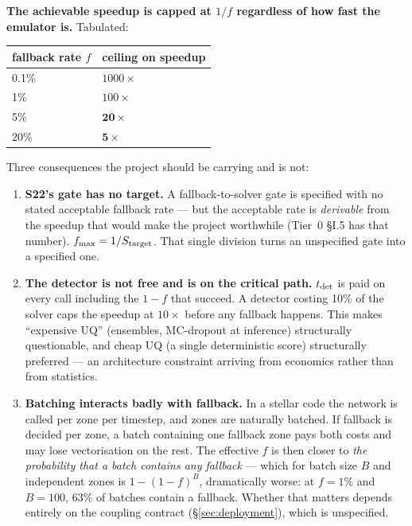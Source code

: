 \textbf{The achievable speedup is capped at $1/f$ regardless of how fast the
emulator is.} Tabulated:

\begin{center}
\begin{tabular}{@{}ll@{}}
\toprule
\textbf{fallback rate $f$} & \textbf{ceiling on speedup} \\
\midrule
0.1\% & $1000\times$ \\
1\%   & $100\times$ \\
5\%   & $\mathbf{20\times}$ \\
20\%  & $\mathbf{5\times}$ \\
\bottomrule
\end{tabular}
\end{center}

Three consequences the project should be carrying and is not:

\begin{enumerate}
\item \textbf{S22's gate has no target.} A fallback-to-solver gate is specified
  with no stated acceptable fallback rate --- but the acceptable rate is
  \emph{derivable} from the speedup that would make the project worthwhile
  (Tier~0 \S I.5 has that number). $f_{\max} = 1/S_{\rm target}$. That single
  division turns an unspecified gate into a specified one.
\item \textbf{The detector is not free and is on the critical path.}
  $t_{\rm det}$ is paid on every call including the $1 - f$ that succeed. A
  detector costing 10\% of the solver caps the speedup at $10\times$ before any
  fallback happens. This makes ``expensive UQ'' (ensembles, MC-dropout at
  inference) structurally questionable, and cheap UQ (a single deterministic
  score) structurally preferred --- an architecture constraint arriving from
  economics rather than from statistics.
\item \textbf{Batching interacts badly with fallback.} In a stellar code the
  network is called per zone per timestep, and zones are naturally batched. If
  fallback is decided per zone, a batch containing one fallback zone pays both
  costs and may lose vectorisation on the rest. The effective $f$ is then closer
  to \emph{the probability that a batch contains any fallback} --- which for
  batch size $B$ and independent zones is $1 - (1-f)^B$, dramatically worse: at
  $f = 1\%$ and $B = 100$, 63\% of batches contain a fallback. Whether that
  matters depends entirely on the coupling contract (\S\ref{sec:deployment}),
  which is unspecified.
\end{enumerate}

